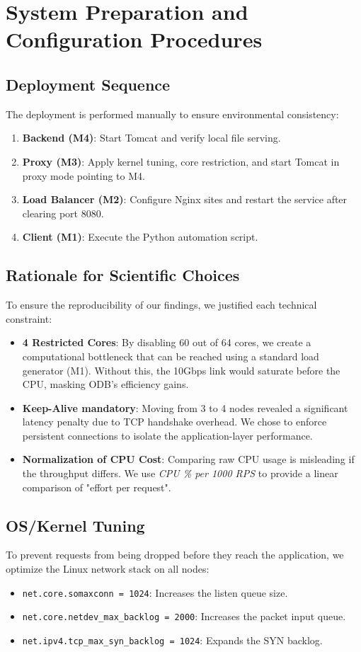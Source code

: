 \documentclass[a4paper,12pt]{article}
\begin{document}
\section{System Preparation and Configuration Procedures}

\subsection{Deployment Sequence}
The deployment is performed manually to ensure environmental consistency:
\begin{enumerate}
    \item \textbf{Backend (M4)}: Start Tomcat and verify local file serving.
    \item \textbf{Proxy (M3)}: Apply kernel tuning, core restriction, and start Tomcat in proxy mode pointing to M4.
    \item \textbf{Load Balancer (M2)}: Configure Nginx sites and restart the service after clearing port 8080.
    \item \textbf{Client (M1)}: Execute the Python automation script.
\end{enumerate}

\subsection{Rationale for Scientific Choices}
To ensure the reproducibility of our findings, we justified each technical constraint:
\begin{itemize}
    \item \textbf{4 Restricted Cores}: By disabling 60 out of 64 cores, we create a computational bottleneck that can be reached using a standard load generator (M1). Without this, the 10Gbps link would saturate before the CPU, masking ODB's efficiency gains.
    \item \textbf{Keep-Alive mandatory}: Moving from 3 to 4 nodes revealed a significant latency penalty due to TCP handshake overhead. We chose to enforce persistent connections to isolate the application-layer performance.
    \item \textbf{Normalization of CPU Cost}: Comparing raw CPU usage is misleading if the throughput differs. We use \textit{CPU \% per 1000 RPS} to provide a linear comparison of "effort per request".
\end{itemize}

\subsection{OS/Kernel Tuning}
To prevent requests from being dropped before they reach the application, we optimize the Linux network stack on all nodes:
\begin{itemize}
    \item \texttt{net.core.somaxconn = 1024}: Increases the listen queue size.
    \item \texttt{net.core.netdev\_max\_backlog = 2000}: Increases the packet input queue.
    \item \texttt{net.ipv4.tcp\_max\_syn\_backlog = 1024}: Expands the SYN backlog.
\end{itemize}
\end{document}
